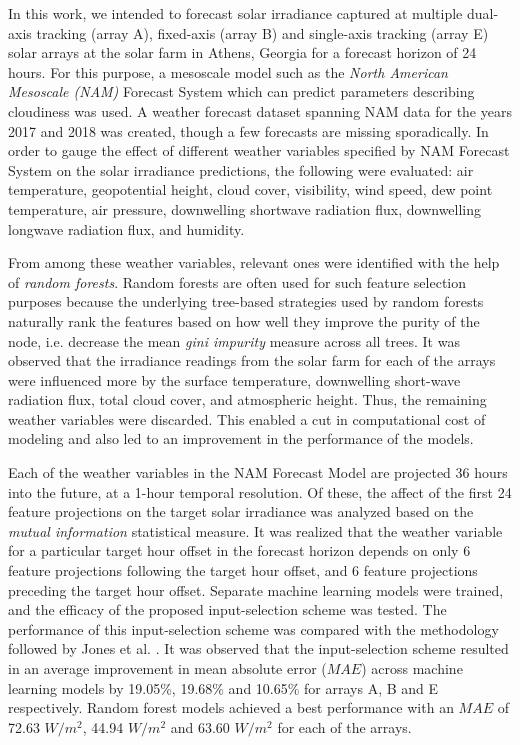 \par In this work, we intended to forecast solar irradiance captured at multiple dual-axis tracking (array A), fixed-axis (array B) and single-axis tracking (array E) solar arrays at the solar farm in Athens, Georgia for a forecast horizon of 24 hours. For this purpose, a mesoscale model such as the \textit{North American Mesoscale (NAM)} Forecast System \cite{multimodel_nam} which can predict parameters describing cloudiness was used. A weather forecast dataset spanning NAM data for the years 2017 and 2018 was created, though a few forecasts are missing sporadically. In order to gauge the effect of different weather variables specified by NAM Forecast System on the solar irradiance predictions, the following were evaluated: air temperature, geopotential height, cloud cover, visibility, wind speed, dew point temperature, air pressure, downwelling shortwave radiation flux, downwelling longwave radiation flux, and humidity.

\par From among these weather variables, relevant ones were identified with the help of \textit{random forests}. Random forests are often used for such feature selection purposes because the underlying tree-based strategies used by random forests naturally rank the features based on how well they improve the purity of the node, i.e. decrease the mean \textit{gini impurity} measure across all trees. It was observed that the irradiance readings from the solar farm for each of the arrays were influenced more by the surface temperature, downwelling short-wave radiation flux, total cloud cover, and atmospheric height. Thus, the remaining weather variables were discarded. This enabled a cut in computational cost of modeling and also led to an improvement in the performance of the models.

\par Each of the weather variables in the NAM Forecast Model are projected 36 hours into the future, at a 1-hour temporal resolution. Of these, the affect of the first 24 feature projections on the target solar irradiance was analyzed based on the \textit{mutual information} statistical measure. It was realized that the weather variable for a particular target hour offset in the forecast horizon depends on only 6 feature projections following the target hour offset, and 6 feature projections preceding the target hour offset. Separate machine learning models were trained, and the efficacy of the proposed input-selection scheme was tested. The performance of this input-selection scheme was compared with the methodology followed by Jones et al. \cite{thesis_zach}. It was observed that the input-selection scheme resulted in an average improvement in mean absolute error ($MAE$) across machine learning models by 19.05\%, 19.68\% and 10.65\% for arrays A, B and E respectively. Random forest models achieved a best performance with an $MAE$ of 72.63 $W/m^2$, 44.94 $W/m^2$ and 63.60 $W/m^2$ for each of the arrays.

